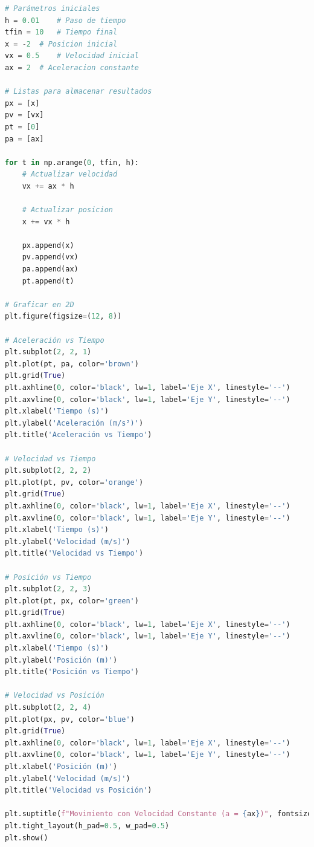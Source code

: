 \documentclass{article}
\begin{document}
\begin{center}
\begin{lstlisting}[language=Python, caption={Implementación de la solución analítica}]
# Parámetros iniciales
h = 0.01    # Paso de tiempo
tfin = 10   # Tiempo final
x = -2  # Posicion inicial
vx = 0.5    # Velocidad inicial
ax = 2  # Aceleracion constante

# Listas para almacenar resultados
px = [x]
pv = [vx]
pt = [0]
pa = [ax]

for t in np.arange(0, tfin, h):
    # Actualizar velocidad
    vx += ax * h

    # Actualizar posicion
    x += vx * h

    px.append(x)
    pv.append(vx)
    pa.append(ax)
    pt.append(t)

# Graficar en 2D
plt.figure(figsize=(12, 8))

# Aceleración vs Tiempo
plt.subplot(2, 2, 1)
plt.plot(pt, pa, color='brown')
plt.grid(True)
plt.axhline(0, color='black', lw=1, label='Eje X', linestyle='--')
plt.axvline(0, color='black', lw=1, label='Eje Y', linestyle='--')
plt.xlabel('Tiempo (s)')
plt.ylabel('Aceleración (m/s²)')
plt.title('Aceleración vs Tiempo')

# Velocidad vs Tiempo
plt.subplot(2, 2, 2)
plt.plot(pt, pv, color='orange')
plt.grid(True)
plt.axhline(0, color='black', lw=1, label='Eje X', linestyle='--')
plt.axvline(0, color='black', lw=1, label='Eje Y', linestyle='--')
plt.xlabel('Tiempo (s)')
plt.ylabel('Velocidad (m/s)')
plt.title('Velocidad vs Tiempo')

# Posición vs Tiempo
plt.subplot(2, 2, 3)
plt.plot(pt, px, color='green')
plt.grid(True)
plt.axhline(0, color='black', lw=1, label='Eje X', linestyle='--')
plt.axvline(0, color='black', lw=1, label='Eje Y', linestyle='--')
plt.xlabel('Tiempo (s)')
plt.ylabel('Posición (m)')
plt.title('Posición vs Tiempo')

# Velocidad vs Posición
plt.subplot(2, 2, 4)
plt.plot(px, pv, color='blue')
plt.grid(True)
plt.axhline(0, color='black', lw=1, label='Eje X', linestyle='--')
plt.axvline(0, color='black', lw=1, label='Eje Y', linestyle='--')
plt.xlabel('Posición (m)')
plt.ylabel('Velocidad (m/s)')
plt.title('Velocidad vs Posición')

plt.suptitle(f"Movimiento con Velocidad Constante (a = {ax})", fontsize=16)
plt.tight_layout(h_pad=0.5, w_pad=0.5)
plt.show()

	\end{lstlisting}


\end{center}
\end{document}
